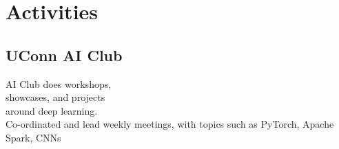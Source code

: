 \documentclass[]{resume-template}
\begin{document}
\begin{minipage}[t]{0.33\textwidth}


	\section{Activities}\label{sec:activities}

	\subsection{UConn AI Club}\label{subsec:uconn-ai-club}
	\textbullet{} AI Club does workshops,\\showcases, and projects \\around deep learning.\\
	\textbullet{} Co-ordinated and lead weekly meetings, with topics such as PyTorch, Apache Spark, CNNs\\

	\vspace{\topsep}






\end{minipage}
\end{document}
